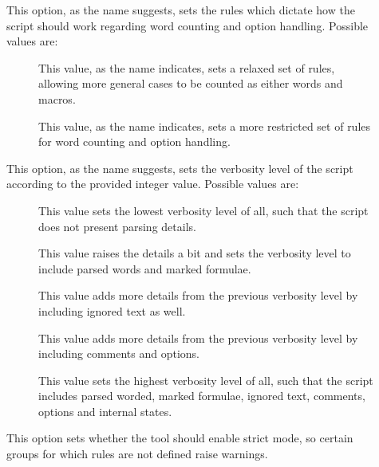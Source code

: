 \begin{description}
\begin{description}
\item[] This option, as the name suggests, sets the rules which dictate how the script should work regarding word counting and option handling. Possible values are:

\begin{description}
\item[] This value, as the name indicates, sets a relaxed set of rules, allowing more general cases to be counted as either words and macros.

\item[] This value, as the name indicates, sets a more restricted set of rules for word counting and option handling.
\end{description}

\item[] This option, as the name suggests, sets the verbosity level of the script according to the provided integer value. Possible values are:

\begin{description}
\item[] This value sets the lowest verbosity level of all, such that the script does not present parsing details.

\item[] This value raises the details a bit and sets the verbosity level to include parsed words and marked formulae.

\item[] This value adds more details from the previous verbosity level by including ignored text as well.

\item[] This value adds more details from the previous verbosity level by including comments and options.

\item[] This value sets the highest verbosity level of all, such that the script includes parsed worded, marked formulae, ignored text, comments, options and internal states.
\end{description}

\item[] This option sets whether the tool should enable strict mode, so certain groups for which rules are not defined raise warnings.


\end{description}
\end{description}
